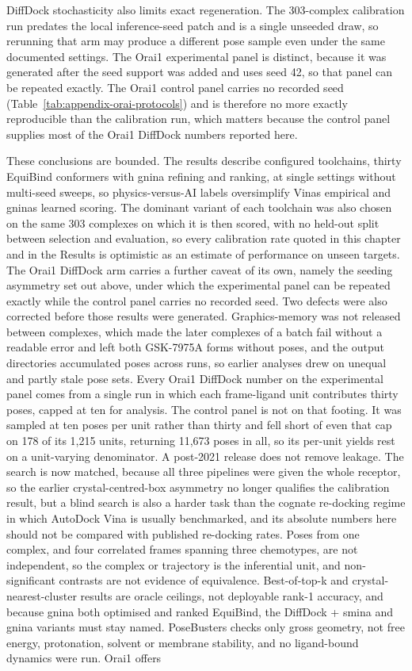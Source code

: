 DiffDock stochasticity also limits exact regeneration. The 303-complex calibration run predates the local inference-seed patch and is a single unseeded draw, so rerunning that arm may produce a different pose sample even under the same documented settings. The Orai1 experimental panel is distinct, because it was generated after the seed support was added and uses seed 42, so that panel can be repeated exactly. The Orai1 control panel carries no recorded seed (Table~\ref{tab:appendix-orai-protocols}) and is therefore no more exactly reproducible than the calibration run, which matters because the control panel supplies most of the Orai1 DiffDock numbers reported here.

These conclusions are bounded. The results describe configured toolchains, thirty EquiBind conformers with gnina refining and ranking, at single settings without multi-seed sweeps, so physics-versus-AI labels oversimplify Vina\textquotesingle s empirical and gnina\textquotesingle s learned scoring. The dominant variant of each toolchain was also chosen on the same 303 complexes on which it is then scored, with no held-out split between selection and evaluation, so every calibration rate quoted in this chapter and in the Results is optimistic as an estimate of performance on unseen targets. The Orai1 DiffDock arm carries a further caveat of its own, namely the seeding asymmetry set out above, under which the experimental panel can be repeated exactly while the control panel carries no recorded seed. Two defects were also corrected before those results were generated. Graphics-memory was not released between complexes, which made the later complexes of a batch fail without a readable error and left both GSK-7975A forms without poses, and the output directories accumulated poses across runs, so earlier analyses drew on unequal and partly stale pose sets. Every Orai1 DiffDock number on the experimental panel comes from a single run in which each frame-ligand unit contributes thirty poses, capped at ten for analysis. The control panel is not on that footing. It was sampled at ten poses per unit rather than thirty and fell short of even that cap on 178 of its 1,215 units, returning 11,673 poses in all, so its per-unit yields rest on a unit-varying denominator. A post-2021 release does not remove leakage. The search is now matched, because all three pipelines were given the whole receptor, so the earlier crystal-centred-box asymmetry no longer qualifies the calibration result, but a blind search is also a harder task than the cognate re-docking regime in which AutoDock Vina is usually benchmarked, and its absolute numbers here should not be compared with published re-docking rates. Poses from one complex, and four correlated frames spanning three chemotypes, are not independent, so the complex or trajectory is the inferential unit, and non-significant contrasts are not evidence of equivalence. Best-of-top-k and crystal-nearest-cluster results are oracle ceilings, not deployable rank-1 accuracy, and because gnina both optimised and ranked EquiBind, the DiffDock + smina and gnina variants must stay named. PoseBusters checks only gross geometry, not free energy, protonation, solvent or membrane stability, and no ligand-bound dynamics were run. Orai1 offers 
